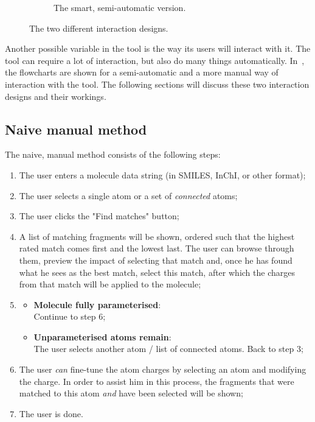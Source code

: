 \begin{figure}[h!]
\begin{subfigure}[t]{0.47\textwidth}
\caption{The smart, semi-automatic version.}
\end{subfigure}
\caption{The two different interaction designs.}
\end{figure}

Another possible variable in the tool is the way its users will interact with it. The tool can require a lot of interaction, but also do many things automatically. In~, the flowcharts are shown for a semi-automatic and a more manual way of interaction with the tool. The following sections will discuss these two interaction designs and their workings.

\subsection{Naive manual method}
The naive, manual method consists of the following steps:
\begin{enumerate}[itemsep=.1em, parsep=.2em, topsep=0em]
\item The user enters a molecule data string (in SMILES, InChI, or other format);
\item The user selects a single atom or a set of \emph{connected} atoms;
\item The user clicks the "Find matches" button;
\item A list of matching fragments will be shown, ordered such that the highest rated match comes first and the lowest last. The user can browse through them, preview the impact of selecting that match and, once he has found what he sees as the best match, select this match, after which the charges from that match will be applied to the molecule;
\item
\begin{itemize}[leftmargin=0cm, itemsep=.1em, parsep=.1em]
\item[] {\bf Molecule fully parameterised}:\\Continue to step 6;
\item[]{\bf Unparameterised atoms remain}:\\The user selects another atom / list of connected atoms. Back to step 3;
\end{itemize}
\item The user \emph{can} fine-tune the atom charges by selecting an atom and modifying the charge. In order to assist him in this process, the fragments that were matched to this atom \emph{and} have been selected will be shown;
\item The user is done.
\end{enumerate}

